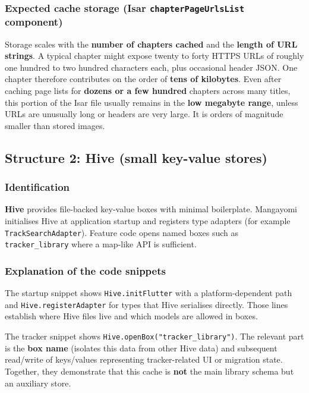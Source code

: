 \subsubsection*{Expected cache storage (Isar \texttt{chapterPageUrlsList} component)}
Storage scales with the \textbf{number of chapters cached} and the \textbf{length of URL strings}. A typical chapter might expose twenty to forty HTTPS URLs of roughly one hundred to two hundred characters each, plus occasional header JSON. One chapter therefore contributes on the order of \textbf{tens of kilobytes}. Even after caching page lists for \textbf{dozens or a few hundred} chapters across many titles, this portion of the Isar file usually remains in the \textbf{low megabyte range}, unless URLs are unusually long or headers are very large. It is orders of magnitude smaller than stored images.


\subsection{Structure 2: Hive (small key-value stores)}

\subsubsection*{Identification}
\textbf{Hive} provides file-backed key-value boxes with minimal boilerplate. Mangayomi initialises Hive at application startup and registers type adapters (for example \texttt{TrackSearchAdapter}). Feature code opens named boxes such as \texttt{tracker\_library} where a map-like API is sufficient.

\subsubsection*{Explanation of the code snippets}
The startup snippet shows \texttt{Hive.initFlutter} with a platform-dependent path and \texttt{Hive.registerAdapter} for types that Hive serialises directly. Those lines establish where Hive files live and which models are allowed in boxes.

The tracker snippet shows \texttt{Hive.openBox("tracker\_library")}. The relevant part is the \textbf{box name} (isolates this data from other Hive data) and subsequent read/write of keys/values representing tracker-related UI or migration state. Together, they demonstrate that this cache is \textbf{not} the main library schema but an auxiliary store.

